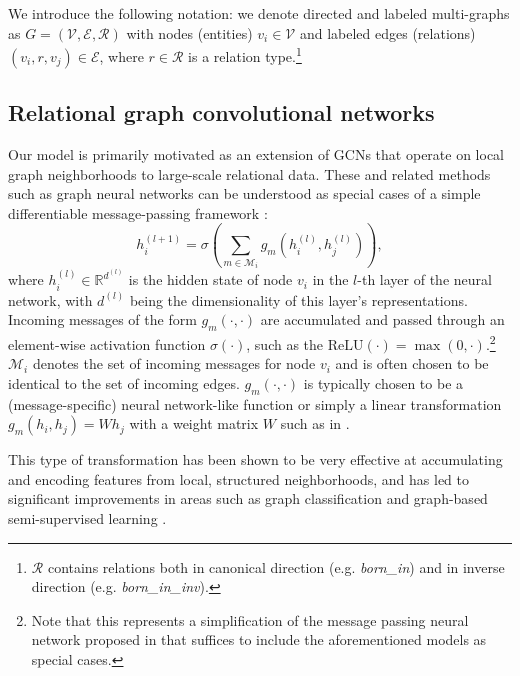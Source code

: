 We introduce the following notation: we denote directed and labeled multi-graphs as $G = (\mathcal{V}, \mathcal{E}, \mathcal{R})$ with nodes (entities) $v_i \in \mathcal{V}$ and labeled edges (relations) $(v_i, r, v_j) \in \mathcal{E}$, where $r\in\mathcal{R}$ is a relation type.\footnote{$\mathcal{R}$ contains relations both in canonical direction (e.g. \textit{born\_in}) and in inverse direction (e.g. \textit{born\_in\_inv}).}

\subsection{Relational graph convolutional networks}
Our model is primarily motivated as an extension of GCNs that operate on local graph neighborhoods \cite{duvenaud2015convolutional,kipf2016semi} to large-scale relational data. These and related methods such as graph neural networks \cite{scarselli2009graph} can be understood as special cases of a simple differentiable message-passing framework \cite{gilmer2017neural}:
\begin{equation}
\label{eq:message-passing}
h_i^{(l+1)}= \sigma \left( \sum_{m \in \mathcal{M}_i} g_m(h_i^{(l)}, h_j^{(l)}) \right),
\end{equation}
where $h_i^{(l)}\in\mathbb{R}^{d^{(l)}}$ is the hidden state of node $v_i$ in the $l$-th layer of the neural network, with $d^{(l)}$ being the dimensionality of this layer's representations. Incoming messages of the form $g_m(\cdot, \cdot)$ are accumulated and passed through an element-wise activation function $\sigma(\cdot)$, such as the $\mathrm{ReLU}(\cdot)=\max(0,\cdot)$.\footnote{Note that this represents a simplification of the message passing neural network proposed in \cite{gilmer2017neural} that suffices to include the aforementioned models as special cases.} $\mathcal{M}_i$ denotes the set of incoming messages for node $v_i$ and is often chosen to be identical to the set of incoming edges. $g_m(\cdot, \cdot)$ is typically chosen to be a (message-specific) neural network-like function or simply a linear transformation $g_m(h_i, h_j)=W h_j$ with a weight matrix $W$ such as in \citet{kipf2016semi}.

This type of transformation has been shown to be very effective at accumulating and encoding features from local, structured neighborhoods, and has led to significant improvements in areas such as graph classification \cite{duvenaud2015convolutional} and graph-based semi-supervised learning \cite{kipf2016semi}.

